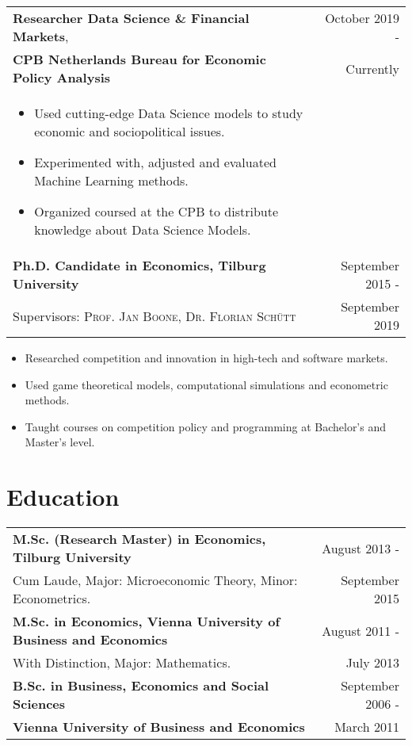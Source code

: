 \documentclass[a4paper,9pt]{article}
\begin{document}
\begin{tabular}{p{15cm} r}
  \textbf{Researcher Data Science \& Financial Markets}, &October 2019 -\\
  \textbf{CPB Netherlands Bureau for Economic Policy Analysis} &Currently\phantom{ -}\\ \vspace{-0.5em}
\begin{itemize}[noitemsep]
  \item Used cutting-edge Data Science models to study economic and sociopolitical issues.
  \item Experimented with, adjusted and evaluated Machine Learning methods.
  \item Organized coursed at the CPB to distribute knowledge about Data Science Models.
\end{itemize}\vspace{-1.0em}\\
  \textbf{Ph.D. Candidate in Economics, Tilburg University} &September 2015 -\\
  \small Supervisors:  \textsc{Prof. Jan Boone},  \textsc{Dr. Florian Schütt} & September 2019\phantom{ -}\\
\end{tabular}\vspace{-0.5em}
\begin{itemize}[noitemsep]
  \item Researched competition and innovation in high-tech and software markets.
  \item Used game theoretical models, computational simulations and econometric methods.
  \item Taught courses on competition policy and programming at Bachelor's and Master's level.
\end{itemize}

\section{Education}

\begin{tabular}{p{15cm} r}
  \textbf{M.Sc. (Research Master) in Economics, Tilburg University}&  August 2013 -\\
  Cum Laude, Major: Microeconomic Theory, Minor: Econometrics.& September 2015\hphantom{-}
  \vspace{0.5em}\\
  \textbf{M.Sc. in Economics, Vienna University of Business and Economics}& August 2011 -\\
  With Distinction, Major: Mathematics. & July 2013\phantom{-}
  \vspace{0.5em}\\
  \textbf{B.Sc. in Business, Economics and Social Sciences}& September 2006 -\\
  \textbf{Vienna University of Business and Economics}& March 2011\phantom{- }\\
\end{tabular}\\
\end{document}
